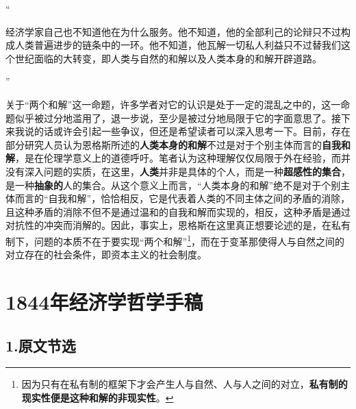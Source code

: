 \documentclass[a4paper,twoside,12pt,AutoFakeBold]{ctexart}
\begin{document}
“\begin{fangsong}
经济学家自己也不知道他在为什么服务。他不知道，他的全部利己的论辩只不过构成人类普遍进步的链条中的一环。他不知道，他瓦解一切私人利益只不过替我们这个世纪面临的大转变，即人类与自然的和解以及人类本身的和解开辟道路。    
\end{fangsong}”

关于“两个和解”这一命题，许多学者对它的认识是处于一定的混乱之中的，这一命题似乎被过分地滥用了，退一步说，至少是被过分地局限于它的字面意思了。接下来我说的话或许会引起一些争议，但还是希望读者可以深入思考一下。目前，存在部分研究人员认为恩格斯所述的\textbf{人类本身的和解}不过是对于个别主体而言的\textbf{自我和解}，是在伦理学意义上的道德呼吁。笔者认为这种理解仅仅局限于外在经验，而并没有深入问题的实质，在这里，\textbf{人类}并非是具体的个人，而是一种\textbf{超感性的集合}，是一种\textbf{抽象的}人的集合。从这个意义上而言，“人类本身的和解”绝不是对于个别主体而言的“自我和解”，恰恰相反，它是代表着人类的不同主体之间的矛盾的消除，且这种矛盾的消除不但不是通过温和的自我和解而实现的，相反，这种矛盾是通过对抗性的冲突而消解的。因此，事实上，恩格斯在这里真正想要论述的是，在私有制下，问题的本质不在于要实现“两个和解”\footnote{因为只有在私有制的框架下才会产生人与自然、人与人之间的对立，\textbf{私有制的现实性便是这种和解的非现实性}。}，而在于变革那使得人与自然之间的对立存在的社会条件，即资本主义的社会制度。
\newpage
\section{1844年经济学哲学手稿}
\subsection{1.原文节选}
\end{document}

